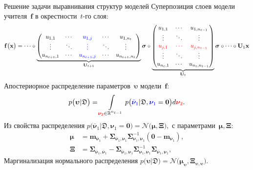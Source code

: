 \documentclass[10pt,pdf,hyperref={unicode}]{beamer}
\begin{document}
\begin{frame}{Решение задачи выравнивания структур моделей}
Суперпозиция слоев модели учителя~$\mathbf{f}$ в окрестности~$t$-го слоя:
{\small
\[
\setlength\abovedisplayskip{0pt}
\mathbf{f}\bigr(\mathbf{x}\bigr) = \cdots \circ
\underbrace{
\begin{pmatrix}
u_{1,1} & \cdots & {\color{blue} u_{1,j}} & \cdots & u_{1,n_{t}} \\
\vdots  & \ddots & {\color{blue} \vdots}  & \ddots & \vdots \\
u_{n_{t+1},1} & \cdots & {\color{blue} u_{n_{t+1},j}} & \cdots & u_{n_{t+1},n_{t}} \\
\end{pmatrix} 
}_{\mathbf{U}_{t+1}}
\bm{\sigma} 
\circ 
\underbrace{
\begin{pmatrix}
u_{1,1} & \cdots & u_{1,n_{t-1}} \\
\vdots  & \ddots & \vdots        \\
{\color{red} u_{j,1}} & {\color{red}\cdots} & {\color{red} u_{j,n_{t-1}}} \\
\vdots  & \ddots & \vdots        \\
u_{n_{t},1} & \cdots & u_{n_{t},n_{t-1}} \\
\end{pmatrix}
}_{\mathbf{U}_{t}}
\bm{\sigma}
\circ 
\cdots
\circ 
\mathbf{U}_1
\mathbf{x}
\setlength\belowdisplayskip{0pt}
\]
}
Апостериорное распределение параметров~$\bm{\upsilon}$ модели~$\mathbf{f}$:
\[
\setlength\abovedisplayskip{0pt}
p\bigr(\bm{\upsilon}|\mathfrak{D}\bigr)  = \int\limits_{{\color{red} \bm{\nu}_2} \in \mathbb{R}^{n_{t-1}}}p\bigr({\color{blue}\bar{\bm{\nu}}_1}|\mathfrak{D}, {\color{blue}\bm{\nu}_1}=\mathbf{0}\bigr) d{\color{red} \bm{\nu}_2}.
\setlength\belowdisplayskip{0pt}
\]
Из свойства распределения 
$
    p\bigr(\bar{\bm{\nu}}_1|\mathfrak{D}, \bm{\nu}_1=\mathbf{0}\bigr) = \mathcal{N}\bigr(\bm{\mu}, \bm{\Xi}\bigr),
$
с параметрами~$\bm{\mu}, \bm{\Xi}$:
\[
\begin{aligned}
\bm{\mu} &= \mathbf{m}_{\bar{\bm{\nu}}_1}+\bm{\Sigma}_{\bar{\bm{\nu}}_1,\bm{\nu}_1} \bm{\Sigma}_{\bm{\nu}_1,\bm{\nu}_1}^{-1} \left(\mathbf{0} - \mathbf{m}_{\bm{\nu}_1}\right), \\
 \bm{\Xi} &= \bm{\Sigma}_{\bar{\bm{\nu}}_1,\bar{\bm{\nu}}_1} - \bm{\Sigma}_{\bar{\bm{\nu}}_1,\bm{\nu}_1} \bm{\Sigma}_{\bm{\nu}_1,\bm{\nu}_1}^{-1} \bm{\Sigma}_{\bar{\bm{\nu}}_1,\bm{\nu}_1},
\end{aligned}
\]
Маргинализация нормального распределения
$
p\bigr(\bm{\upsilon}|\mathfrak{D}\bigr) = \mathcal{N}\bigr(\bm{\mu}_{\bm{\upsilon}},  \bm{\Xi}_{\bm{\upsilon}, \bm{\upsilon}}\bigr).
$
\end{frame}
\end{document}
